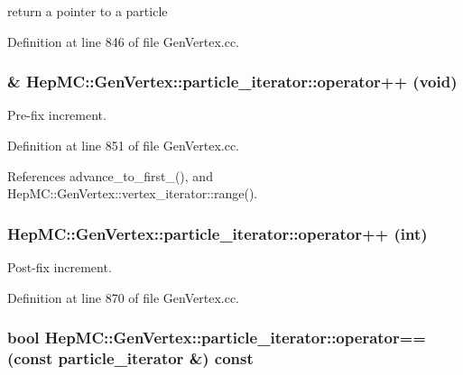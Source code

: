 return a pointer to a particle 



Definition at line 846 of file Gen\-Vertex.cc.
\subsubsection{ \& Hep\-MC::Gen\-Vertex::particle\_\-iterator::operator++ (void)}\label{classHepMC_1_1GenVertex_1_1particle__iterator_fdbae6accd220313f2fb349aee188c49}


Pre-fix increment. 



Definition at line 851 of file Gen\-Vertex.cc.

References advance\_\-to\_\-first\_\-(), and Hep\-MC::Gen\-Vertex::vertex\_\-iterator::range().
\subsubsection{ Hep\-MC::Gen\-Vertex::particle\_\-iterator::operator++ (int)}\label{classHepMC_1_1GenVertex_1_1particle__iterator_24dddc010d733718ac9cd1c5f84403b2}


Post-fix increment. 



Definition at line 870 of file Gen\-Vertex.cc.
\subsubsection{\setlength{\rightskip}{0pt plus 5cm}bool Hep\-MC::Gen\-Vertex::particle\_\-iterator::operator== (const {\bf particle\_\-iterator} \&) const\hspace{0.3cm}{\tt  [inline]}}\label{classHepMC_1_1GenVertex_1_1particle__iterator_364021ecb360e739605c548bbd35f335}


